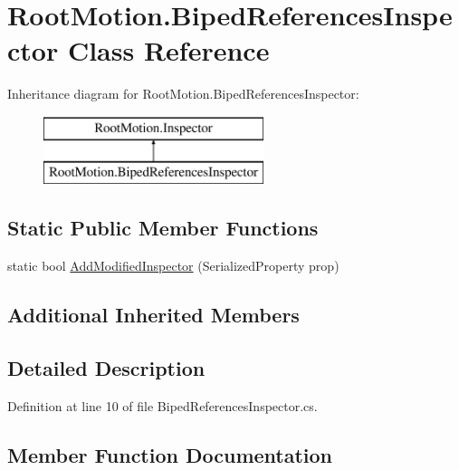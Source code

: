 \hypertarget{class_root_motion_1_1_biped_references_inspector}{}\section{Root\+Motion.\+Biped\+References\+Inspector Class Reference}
\label{class_root_motion_1_1_biped_references_inspector}
Inheritance diagram for Root\+Motion.\+Biped\+References\+Inspector\+:\begin{figure}[H]
\begin{center}
\leavevmode
\includegraphics[height=2.000000cm]{class_root_motion_1_1_biped_references_inspector}
\end{center}
\end{figure}
\subsection*{Static Public Member Functions}
\begin{DoxyCompactItemize}
\item 
static bool \mbox{\hyperlink{class_root_motion_1_1_biped_references_inspector_a2ff914d5c573b5f8e60ca8c07fea3ad4}{Add\+Modified\+Inspector}} (Serialized\+Property prop)
\end{DoxyCompactItemize}
\subsection*{Additional Inherited Members}


\subsection{Detailed Description}


Definition at line 10 of file Biped\+References\+Inspector.\+cs.



\subsection{Member Function Documentation}
\mbox{\label{class_root_motion_1_1_biped_references_inspector_a2ff914d5c573b5f8e60ca8c07fea3ad4}} 
